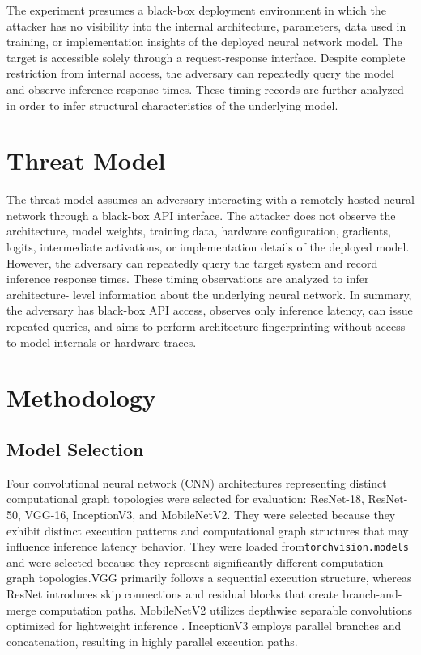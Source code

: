\documentclass[conference]{IEEEtran}
\begin{document}
The experiment presumes a black-box deployment environment in which the attacker has no visibility into the internal architecture, parameters, data used in training, or implementation insights of the deployed neural network model. The target is accessible solely through a request-response interface. Despite complete restriction from internal access, the adversary can repeatedly query the model and observe inference response times. These timing records are further analyzed in order to infer structural characteristics of the underlying model.

\section{Threat Model}
The threat model assumes an adversary interacting with a
remotely hosted neural network through a black-box API
interface. The attacker does not observe the architecture,
model weights, training data, hardware configuration, gradients, logits, intermediate activations, or implementation details
of the deployed model. However, the adversary can repeatedly
query the target system and record inference response times.
These timing observations are analyzed to infer architecture-
level information about the underlying neural network. In
summary, the adversary has black-box API access, observes
only inference latency, can issue repeated queries, and aims
to perform architecture fingerprinting without access to model
internals or hardware traces.

\section{Methodology}

\subsection{Model Selection}
Four convolutional neural network (CNN) architectures representing distinct computational graph topologies were selected for evaluation: ResNet-18, ResNet-50, VGG-16, InceptionV3, and MobileNetV2. They were selected because they exhibit distinct execution patterns and computational graph structures that may influence inference latency behavior. They were loaded from\texttt{torchvision.models}~\cite{vgg,resnet,inceptionv3} and were selected because they represent significantly different computation graph topologies.VGG primarily follows a sequential execution structure, whereas ResNet introduces skip connections and residual blocks that create branch-and-merge computation paths. MobileNetV2 utilizes depthwise separable convolutions optimized for lightweight inference \cite{mobilenetv2}. InceptionV3 employs parallel branches and concatenation, resulting in highly parallel execution paths.
\end{document}
